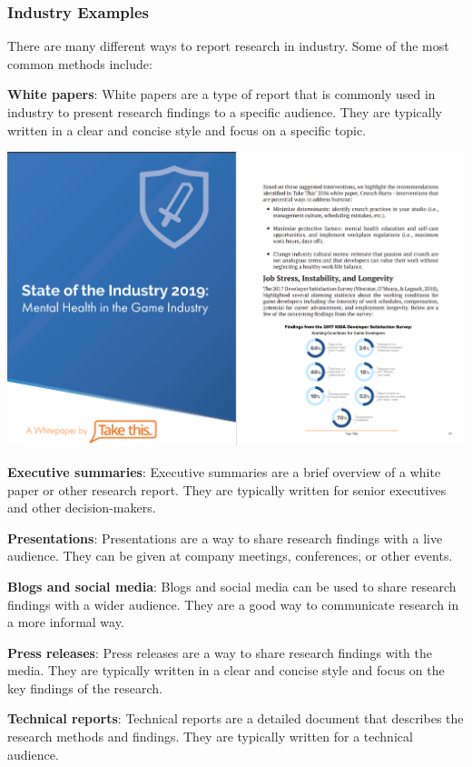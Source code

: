 \documentclass[
]{book}
\begin{document}
\subsubsection*{Industry Examples}\label{industry-examples}

There are many different ways to report research in industry. Some of the most common methods include:

\textbf{White papers}: White papers are a type of report that is commonly used in industry to present research findings to a specific audience. They are typically written in a clear and concise style and focus on a specific topic.

\includegraphics[width=1\textwidth,height=\textheight]{images/white_paper.png}

\textbf{Executive summaries}: Executive summaries are a brief overview of a white paper or other research report. They are typically written for senior executives and other decision-makers.

\textbf{Presentations}: Presentations are a way to share research findings with a live audience. They can be given at company meetings, conferences, or other events.

\textbf{Blogs and social media}: Blogs and social media can be used to share research findings with a wider audience. They are a good way to communicate research in a more informal way.

\textbf{Press releases}: Press releases are a way to share research findings with the media. They are typically written in a clear and concise style and focus on the key findings of the research.

\textbf{Technical reports}: Technical reports are a detailed document that describes the research methods and findings. They are typically written for a technical audience.
\end{document}
